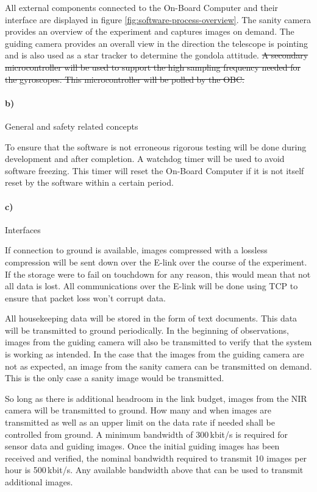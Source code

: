 All external components connected to the On-Board Computer and their interface are displayed in figure \ref{fig:software-process-overview}. The sanity camera provides an overview of the experiment and captures images on demand. The guiding camera provides an overall view in the direction the telescope is pointing and is also used as a star tracker to determine the gondola attitude. \st{A secondary microcontroller will be used to support the high sampling frequency needed for the gyroscopes. This microcontroller will be polled by the OBC.}

\paragraph{b)} General and safety related concepts

To ensure that the software is not erroneous rigorous testing will be done during development and after completion. A watchdog timer will be used to avoid software freezing. This timer will reset the On-Board Computer if it is not itself reset by the software within a certain period.

\paragraph{c)} Interfaces

If connection to ground is available, images compressed with a lossless compression will be sent down over the E-link over the course of the experiment. If the storage were to fail on touchdown for any reason, this would mean that not all data is lost. All communications over the E-link will be done using TCP to ensure that packet loss won't corrupt data.



All housekeeping data will be stored in the form of text documents. This data will be transmitted to ground periodically. In the beginning of observations, images from the guiding camera will also be transmitted to verify that the system is working as intended. In the case that the images from the guiding camera are not as expected, an image from the sanity camera can be transmitted on demand. This is the only case a sanity image would be transmitted.

So long as there is additional headroom in the link budget, images from the NIR camera will be transmitted to ground. How many and when images are transmitted as well as an upper limit on the data rate if needed shall be controlled from ground. A minimum bandwidth of 300\,kbit/s is required for sensor data and guiding images. Once the initial guiding images has been received and verified, the nominal bandwidth required to transmit 10 images per hour is 500\,kbit/s. Any available bandwidth above that can be used to transmit additional images.

